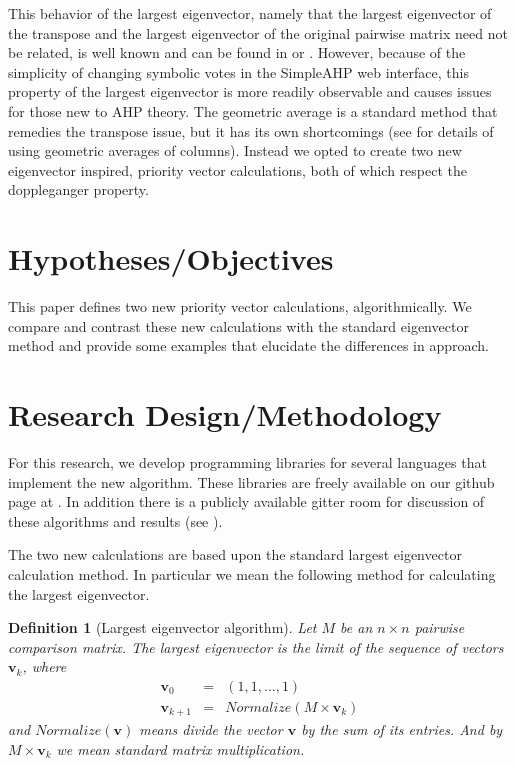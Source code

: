 \documentclass[11pt]{article}
\newtheorem{definition}{Definition}
\begin{document}
This behavior of the largest eigenvector, namely that the largest eigenvector
of the transpose and the largest eigenvector of the original pairwise matrix need
not be related, is well known and can be found in \cite{choo2004common} or
\cite{saaty1990eigenvector}.
However, because of the simplicity of changing symbolic votes in the SimpleAHP
web interface, this property of the largest eigenvector is more readily observable
and causes issues for those new to AHP theory.
The geometric average is a standard method that remedies the transpose issue, but
it has its own shortcomings (see \cite{barzilai1994ahp} for details of using
geometric averages of columns).  Instead we opted to create two new
eigenvector inspired, priority vector calculations, both of which respect the
doppleganger property.

\section{Hypotheses/Objectives}
This paper defines two new priority vector calculations, algorithmically.
We compare and contrast these new calculations with the standard eigenvector
method and provide some examples that elucidate the differences in approach.

\section{Research Design/Methodology}
For this research, we develop programming libraries for several languages that
implement the new algorithm.  These libraries are freely available on our github
page at \cite{githubahppri}.  In addition there is a publicly available gitter
room for discussion of these algorithms and results (see \cite{gitterahppri}).

The two new calculations are based upon the standard largest eigenvector calculation
method. In particular we mean the following method for calculating the largest
eigenvector.

\begin{definition}[Largest eigenvector algorithm]
	\label{def:eigen}
	Let $M$ be an $n \times n$ pairwise comparison matrix. The 
	largest eigenvector is the limit of the
	sequence of vectors $\mathbf{v}_k$, where
	\begin{eqnarray*}
		\mathbf{v}_0 &=& (1, 1, \ldots, 1) \\
		\mathbf{v}_{k+1} &=& Normalize(M \times \mathbf{v}_k)
	\end{eqnarray*}
	and $Normalize(\mathbf{v})$ means divide the vector $\mathbf{v}$ by the sum of its entries.  And by $M \times \mathbf{v}_k$ we mean standard matrix multiplication.
\end{definition}
\end{document}
